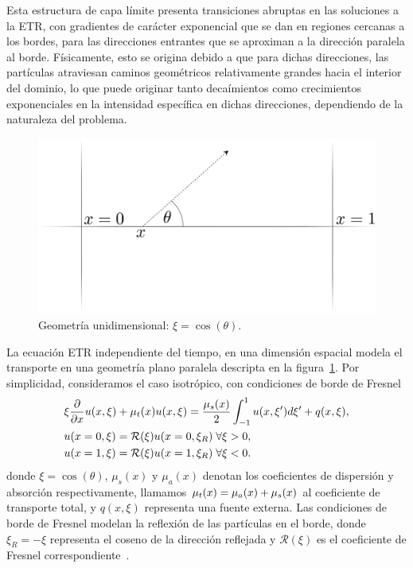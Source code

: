 Esta estructura de capa límite presenta transiciones abruptas 
en las soluciones a la ETR, con gradientes de carácter exponencial 
que se dan en regiones cercanas a los bordes, para las direcciones 
entrantes que se aproximan a la dirección paralela al borde. 
Físicamente, esto se origina debido a que para dichas direcciones, 
las partículas atraviesan caminos geométricos relativamente grandes 
hacia el interior del dominio, lo que puede originar tanto decaímientos 
como crecimientos exponenciales en la intensidad específica en dichas direcciones, 
dependiendo de la naturaleza del problema.
\begin{figure}[h!]
\centering
  \includegraphics[width=0.5\linewidth]{figuras/geom.pdf}
  \caption{Geometría unidimensional: $\xi = \cos(\theta)$.}
 \label{fig:parallelgeom}
\end{figure}
La ecuación ETR independiente del tiempo, en una dimensión espacial 
modela el transporte en una geometría plano paralela descripta en la 
figura~\ref{fig:parallelgeom}. Por simplicidad, consideramos 
el caso isotrópico, con condiciones de borde de Fresnel
\begin{equation}
\begin{split}
  &\xi \frac{\partial}{\partial x}u(x,\xi)+\mu_t(x)u(x,\xi)=   \frac{\mu_s(x)}{2} \int_{-1}^{1}u(x,\xi') d\xi' +q(x,\xi),\\
  &u(x=0,\xi)=\mathcal{R}(\xi)u(x=0,\xi_R) \; \forall \xi>0,\\
  &u(x=1,\xi)=\mathcal{R}(\xi)u(x=1,\xi_R) \; \forall \xi<0.
\end{split}
\label{eq:transp1d}
\end{equation}
donde $\xi=\cos(\theta)$,  $\mu_s(x)$ y $\mu_a(x)$ denotan 
los coeficientes de dispersión y absorción respectivamente, 
llamamos $\mu_t(x)=\mu_a(x)+\mu_s(x)$ al coeficiente de transporte 
total, y $q(x,\xi)$ representa una fuente externa. Las condiciones de 
borde de Fresnel modelan la reflexión de las partículas en el borde, 
donde $\xi_R=-\xi$ representa el coseno de la dirección reflejada 
y $\mathcal{R}(\xi)$ es el coeficiente de Fresnel correspondiente~\cite{Born1999}.


